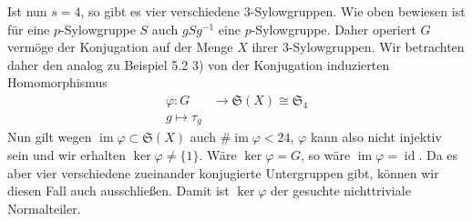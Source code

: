 \documentclass{article}
\newcommand{\id}{\operatorname{id}}
\newcommand{\im}{\operatorname{im}}
\begin{document}
\begin{enumerate}[(a)]
    Ist nun $s = 4$, so gibt es vier verschiedene $3$-Sylowgruppen. 
    Wie oben bewiesen ist für eine $p$-Sylowgruppe $S$ auch $gSg^{-1}$ eine $p$-Sylowgruppe.
    Daher operiert $G$ vermöge der Konjugation auf der Menge $X$ ihrer $3$-Sylowgruppen.
    Wir betrachten daher den analog zu Beispiel 5.2 3) von der Konjugation induzierten Homomorphismus
    \begin{align}
        \varphi\colon G &\to \mathfrak{S}(X) \cong \mathfrak{S}_4\\
        g \mapsto \tau_g
    \end{align}
    Nun gilt wegen $\im \varphi \subset \mathfrak{S}(X)$ auch $\# \im \varphi < 24$, $\varphi$ kann also nicht injektiv sein
    und wir erhalten $\ker \varphi \neq \{1\}$.
    Wäre $\ker \varphi = G$, so wäre $\im \varphi = \id$. Da es aber vier verschiedene zueinander konjugierte Untergruppen gibt,
    können wir diesen Fall auch ausschließen.
    Damit ist $\ker \varphi$ der gesuchte nichttriviale Normalteiler.
\end{enumerate}
\end{document}
